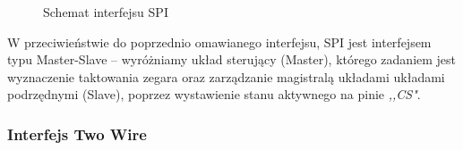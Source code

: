 \begin{figure}[!h]
                \caption{Schemat interfejsu SPI}
            \end{figure}
            \noindent
            W przeciwieństwie do poprzednio omawianego interfejsu,
            SPI jest interfejsem typu Master-Slave -- wyróżniamy układ sterujący (Master),
            którego zadaniem jest wyznaczenie taktowania zegara 
            oraz zarządzanie magistralą układami układami podrzędnymi (Slave), poprzez wystawienie stanu aktywnego na pinie \textit{,,CS"}.

        

        \subsubsection{Interfejs Two Wire}
            